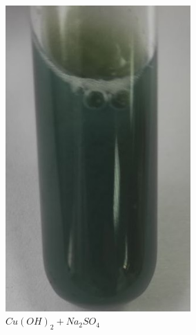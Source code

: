 \begin{figure}[h]
    \centering
    \begin{subfigure}[b]{0.45\textwidth}
        \centering
        \includegraphics[width=0.78\textwidth]{Ex_5/Cu_2.jpg}
        \caption{$Cu(OH)_2 + Na_2SO_4$}
    \end{subfigure}
    \quad
    \begin{subfigure}[b]{0.45\textwidth}
        \centering

\end{subfigure}
\end{figure}
